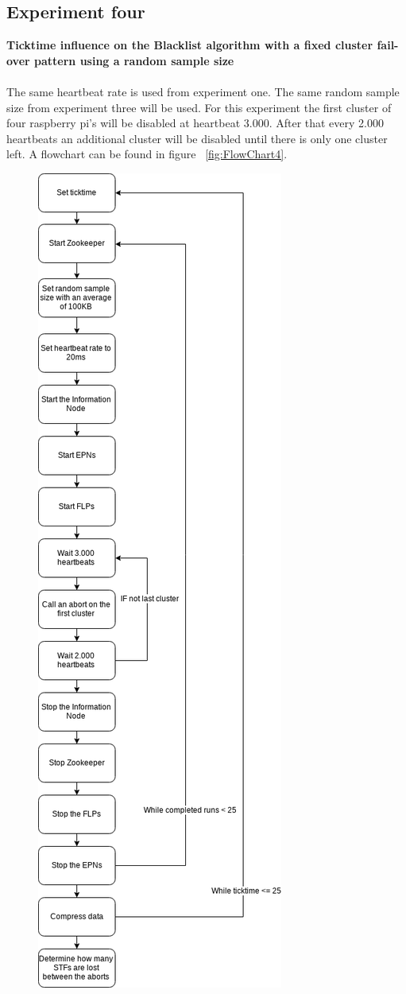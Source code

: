 \documentclass{report}
\begin{document}
\subsection{Experiment four}
\textbf{Ticktime influence on the Blacklist algorithm with a fixed cluster fail-over pattern using a random sample size}
\\~\\
The same heartbeat rate is used from experiment one. The same random sample size from experiment three will be used. For this experiment the first cluster of four raspberry pi's will be disabled at heartbeat 3.000. After that every 2.000 heartbeats an additional cluster will be disabled until there is only one cluster left. A flowchart can be found in figure ~\ref{fig:FlowChart4}.

\begin{figure}[htb]
	\centering
	\includegraphics[scale=0.3]{./graphics/ex4.png}

\end{figure}
\end{document}
